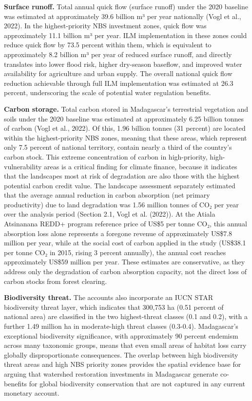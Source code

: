 \documentclass[
  letterpaper,
  DIV=11,
  numbers=noendperiod]{scrartcl}
\begin{document}
\textbf{Surface runoff.} Total annual quick flow (surface runoff) under
the 2020 baseline was estimated at approximately 39.6 billion m³ per
year nationally (Vogl et al., 2022). In the highest-priority NBS
investment zones, quick flow was approximately 11.1 billion m³ per year.
ILM implementation in these zones could reduce quick flow by 73.5
percent within them, which is equivalent to approximately 8.2 billion m³
per year of reduced surface runoff, and directly translates into lower
flood risk, higher dry-season baseflow, and improved water availability
for agriculture and urban supply. The overall national quick flow
reduction achievable through full ILM implementation was estimated at
26.3 percent, underscoring the scale of potential water regulation
benefits.

\textbf{Carbon storage.} Total carbon stored in Madagascar's terrestrial
vegetation and soils under the 2020 baseline was estimated at
approximately 6.25 billion tonnes of carbon (Vogl et al., 2022). Of
this, 1.96 billion tonnes (31 percent) are located within the
highest-priority NBS zones, meaning that these areas, which represent
only 7.5 percent of national territory, contain nearly a third of the
country's carbon stock. This extreme concentration of carbon in
high-priority, high-vulnerability areas is a critical finding for
climate finance, because it indicates that the landscapes most at risk
of degradation are also those with the highest potential carbon credit
value. The landscape assessment separately estimated that the average
annual reduction in carbon absorption (net primary productivity) due to
land degradation was 1.56 million tonnes of CO₂ per year over the
analysis period (Section 2.1, Vogl et al. (2022)). At the Atiala
Atsinanana REDD+ program reference price of US\$5 per tonne CO₂, this
annual absorption loss alone represents a foregone revenue of
approximately US\$7.8 million per year, while at the social cost of
carbon applied in the study (US\$38.1 per tonne CO₂ in 2015, rising 3
percent annually), the annual cost reaches approximately US\$59 million
per year. These estimates are conservative, as they address only the
degradation of carbon absorption capacity, not the direct loss of carbon
stocks from forest clearing.

\textbf{Biodiversity threat.} The accounts also incorporate an IUCN STAR
biodiversity threat layer, which indicates that 300,753 ha (0.51 percent
of national area) are classified in the two highest-threat classes (0.1
and 0.2), with a further 1.49 million ha in moderate-high threat classes
(0.3-0.4). Madagascar's exceptional biodiversity significance, with
approximately 90 percent endemism across many taxonomic groups, means
that even small areas of habitat loss carry globally disproportionate
consequences. The overlap between high biodiversity threat areas and
high NBS priority zones provides the spatial evidence base for arguing
that watershed restoration investments in Madagascar generate
co-benefits for global biodiversity conservation that are not captured
in any current monetary account.
\end{document}

